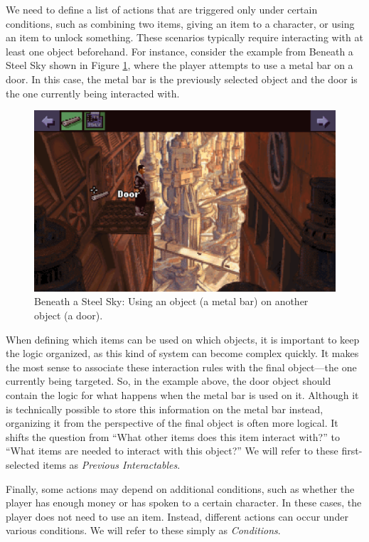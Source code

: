 We need to define a list of actions that are triggered only under certain conditions, such as combining two items, giving an item to a character, or using an item to unlock something. These scenarios typically require interacting with at least one object beforehand. For instance, consider the example from Beneath a Steel Sky shown in Figure \ref{fig:Logic-BaSS}, where the player attempts to use a metal bar on a door. In this case, the metal bar is the previously selected object and the door is the one currently being interacted with.

\begin{figure}[H]
\centering
\includegraphics[width=.8\linewidth]{img/C-BaSS.png}
\caption{Beneath a Steel Sky: Using an object (a metal bar) on another object (a door).}
\label{fig:Logic-BaSS}
\end{figure}

When defining which items can be used on which objects, it is important to keep the logic organized, as this kind of system can become complex quickly. It makes the most sense to associate these interaction rules with the final object—the one currently being targeted. So, in the example above, the door object should contain the logic for what happens when the metal bar is used on it. Although it is technically possible to store this information on the metal bar instead, organizing it from the perspective of the final object is often more logical. It shifts the question from “What other items does this item interact with?” to “What items are needed to interact with this object?” We will refer to these first-selected items as \textit{Previous Interactables}.

Finally, some actions may depend on additional conditions, such as whether the player has enough money or has spoken to a certain character. In these cases, the player does not need to use an item. Instead, different actions can occur under various conditions. We will refer to these simply as \textit{Conditions}.

